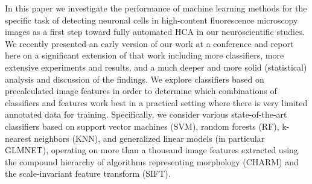 

In this paper we investigate the performance of machine learning methods for the specific task of detecting neuronal cells in high-content fluorescence microscopy images as a first step toward fully automated HCA in our neuroscientific studies. We recently presented an early version of our work at a conference \citep{Mata-2016} and report here on a significant extension of that work including more classifiers, more extensive experiments and results, and a much deeper and more solid (statistical) analysis and discussion of the findings. {\color{red}We explore classifiers based on precalculated image features in order to determine which combinations of classifiers and features work best in a practical setting where there is very limited annotated data for training. Specifically, we consider various state-of-the-art classifiers based on support vector machines (SVM), random forests (RF), k-nearest neighbors (KNN), and generalized linear models (in particular GLMNET)}, operating on more than a thousand image features extracted using the compound hierarchy of algorithms representing morphology (CHARM) and the scale-invariant feature transform (SIFT).


